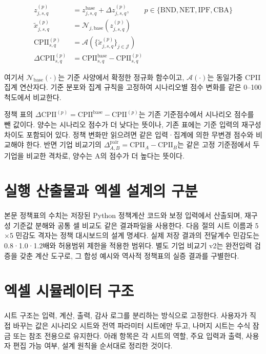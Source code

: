 \documentclass[11pt,a4paper]{report}
\begin{document}
\begin{align}
z^{(p)}_{j,s,q} &= z^{\mathrm{base}}_{j,s,q} + \Delta z^{(p)}_{j,s,q}, \qquad p \in \{\mathrm{BND},\mathrm{NET},\mathrm{IPF},\mathrm{CBA}\} \\
\widetilde{x}^{(p)}_{j,s,q} &= \mathcal{N}_{j,\mathrm{base}}\!\left(z^{(p)}_{j,s,q}\right) \\
\mathrm{CPII}^{(p)}_{s,q} &= \mathcal{A}\!\left(\{\widetilde{x}^{(p)}_{j,s,q}\}_{j \in \mathcal J}\right) \\
\Delta \mathrm{CPII}^{(p)}_{s,q} &= \mathrm{CPII}^{\mathrm{base}}_{s,q} - \mathrm{CPII}^{(p)}_{s,q}
\end{align}

여기서 $\mathcal{N}_{\mathrm{base}}(\cdot)$는 기준 사양에서 확정한 정규화 함수이고, $\mathcal{A}(\cdot)$는 동일가중 CPII 집계 연산자다. 기준 분포와 집계 규칙을 고정하여 시나리오별 점수 변화를 같은 0--100 척도에서 비교한다.

정책 표의 \(\Delta\mathrm{CPII}^{(p)}=\mathrm{CPII}^{\mathrm{base}}-\mathrm{CPII}^{(p)}\)는 기존 기준점수에서 시나리오 점수를 뺀 값이다. 양수는 시나리오 점수가 더 낮다는 뜻이나, 기존 표에는 기준 입력의 재구성 차이도 포함되어 있다. 정책 변화만 읽으려면 같은 입력·집계에 의한 무변경 점수와 비교해야 한다. 반면 기업 비교기의 \(\Delta^{\mathrm{pair}}_{A,B}=\mathrm{CPII}_A-\mathrm{CPII}_B\)는 같은 고정 기준점에서 두 기업을 비교한 격차로, 양수는 A의 점수가 더 높다는 뜻이다.

\section{실행 산출물과 엑셀 설계의 구분}
본문 정책표의 수치는 저장된 Python 정책계산 코드와 보정 입력에서 산출되며, 재구성 기준값 분해와 공통 셀 비교도 같은 결과파일을 사용한다. 다음 절의 시트 이름과 5\(\times\)5 민감도 격자는 정책 대시보드의 설계 명세다. 실제 저장 결과의 전달계수 민감도는 0.8·1.0·1.2배와 허용범위 제한을 적용한 범위다. 별도 기업 비교기 v2는 완전입력 검증을 갖춘 계산 도구로, 그 합성 예시와 역사적 정책표의 실증 결과를 구별한다.

\section{엑셀 시뮬레이터 구조}
시트 구조는 입력, 계산, 출력, 감사 로그를 분리하는 방식으로 고정한다. 사용자가 직접 바꾸는 값은 시나리오 시트와 전역 파라미터 시트에만 두고, 나머지 시트는 수식 잠금 또는 참조 전용으로 유지한다.
아래 항목은 각 시트의 역할, 주요 입력과 출력, 사용자 편집 가능 여부, 설계 원칙을 순서대로 정리한 것이다.
\end{document}
